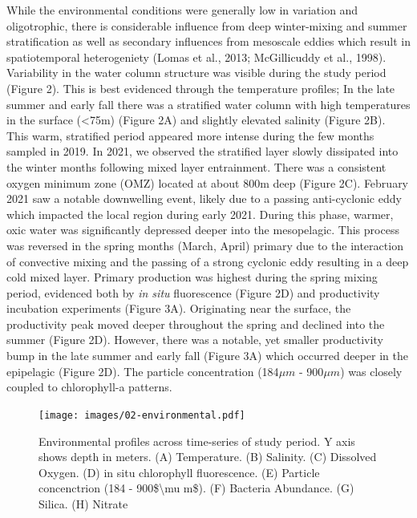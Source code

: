 \documentclass[
]{article}
\begin{document}
While the environmental conditions were generally low in variation and
oligotrophic, there is considerable influence from deep winter-mixing
and summer stratification as well as secondary influences from mesoscale
eddies which result in spatiotemporal heterogeniety (Lomas et al., 2013;
McGillicuddy et al., 1998). Variability in the water column structure
was visible during the study period (Figure 2). This is best evidenced
through the temperature profiles; In the late summer and early fall
there was a stratified water column with high temperatures in the
surface (\textless75m) (Figure 2A) and slightly elevated salinity
(Figure 2B). This warm, stratified period appeared more intense during
the few months sampled in 2019. In 2021, we observed the stratified
layer slowly dissipated into the winter months following mixed layer
entrainment. There was a consistent oxygen minimum zone (OMZ) located at
about 800m deep (Figure 2C). February 2021 saw a notable downwelling
event, likely due to a passing anti-cyclonic eddy which impacted the
local region during early 2021. During this phase, warmer, oxic water
was significantly depressed deeper into the mesopelagic. This process
was reversed in the spring months (March, April) primary due to the
interaction of convective mixing and the passing of a strong cyclonic
eddy resulting in a deep cold mixed layer. Primary production was
highest during the spring mixing period, evidenced both by \emph{in
situ} fluorescence (Figure 2D) and productivity incubation experiments
(Figure 3A). Originating near the surface, the productivity peak moved
deeper throughout the spring and declined into the summer (Figure 2D).
However, there was a notable, yet smaller productivity bump in the late
summer and early fall (Figure 3A) which occurred deeper in the
epipelagic (Figure 2D). The particle concentration (184\(\mu m\) -
900\(\mu m\)) was closely coupled to chlorophyll-a patterns.

\begin{figure}[H]

{\centering \texttt{[image: images/02-environmental.pdf]}

}

\caption{Environmental profiles across time-series of study period. Y
axis shows depth in meters. (A) Temperature. (B) Salinity. (C) Dissolved
Oxygen. (D) in situ chlorophyll fluorescence. (E) Particle concenctrion
(184 - 900\$\textbackslash mu m\$). (F) Bacteria Abundance. (G) Silica.
(H) Nitrate}

\end{figure}%
\end{document}
